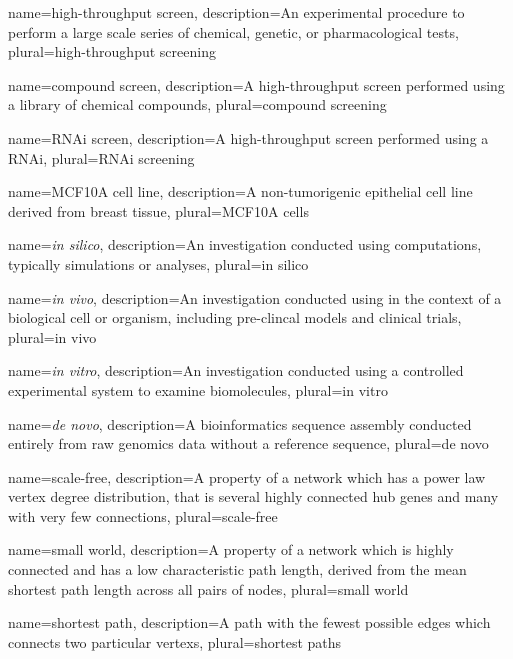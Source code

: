 {
  name=high-throughput screen,
  description={An experimental procedure to perform a large scale series of chemical, genetic, or pharmacological tests},
  plural=high-throughput screening
}


{
  name=compound screen,
  description={A \gls{high-throughput screen} performed using a library of chemical compounds},
  plural=compound screening
}

{
  name=RNAi screen,
  description={A \gls{high-throughput screen} performed using a \acrfull{RNAi}},
  plural=RNAi screening
}


{
  name=MCF10A cell line,
  description={A non-tumorigenic epithelial cell line derived from breast tissue},
  plural=MCF10A cells
}


{
  name=\textit{in silico},
  description={An investigation conducted using computations, typically simulations or analyses},
  plural=in silico
}


{
  name=\textit{in vivo},
  description={An investigation conducted using in the context of a biological cell or organism, including pre-clincal models and clinical trials},
  plural=in vivo
}


{
  name=\textit{in vitro},
  description={An investigation conducted using a controlled experimental system to examine biomolecules},
  plural=in vitro
}


{
  name=\textit{de novo},
  description={A bioinformatics sequence assembly conducted entirely from raw genomics data without a reference sequence},
  plural=de novo
}


{
  name=scale-free,
  description={A property of a network which has a power law \gls{vertex degree} distribution, that is several highly connected \gls{hub} genes and many with very few connections},
  plural=scale-free
}


{
  name=small world,
  description={A property of a network which is highly connected and has a low characteristic path length, derived from the mean \gls{shortest path} length across all pairs of nodes},
  plural=small world
}


{
  name=shortest path,
  description={A path with the fewest possible \glspl{edge} which connects two particular \glspl{vertex}},
  plural=shortest paths
}


